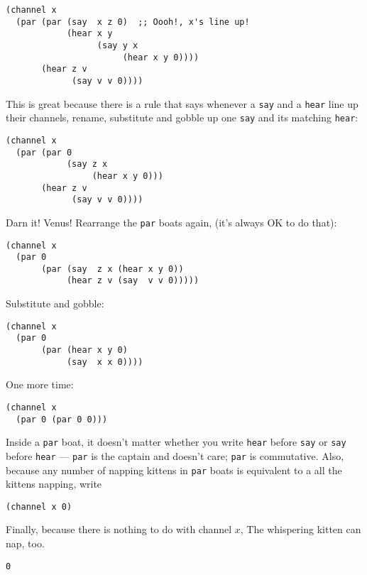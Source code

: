 \documentclass[10pt,oneside,x11names]{article}
\theoremstyle{definition}
\theoremstyle{warning}
\begin{document}
\vskip 0.26cm
\begin{verbatim}
(channel x
  (par (par (say  x z 0)  ;; Oooh!, x's line up!
            (hear x y
                  (say y x
                       (hear x y 0))))
       (hear z v
             (say v v 0))))
\end{verbatim}

This is great because there is a rule that says whenever a
\texttt{say} and a \texttt{hear} line up their channels, rename, substitute
and gobble up one \texttt{say} and its matching \texttt{hear}:

\vskip 0.26cm
\begin{verbatim}
(channel x
  (par (par 0
            (say z x
                 (hear x y 0)))
       (hear z v
             (say v v 0))))
\end{verbatim}

Darn it! Venus! Rearrange the \texttt{par} boats again, (it's always OK to do
that):

\vskip 0.26cm
\begin{verbatim}
(channel x
  (par 0
       (par (say  z x (hear x y 0))
            (hear z v (say  v v 0)))))
\end{verbatim}

Substitute and gobble:

\vskip 0.26cm
\begin{verbatim}
(channel x
  (par 0
       (par (hear x y 0)
            (say  x x 0))))
\end{verbatim}

One more time:

\vskip 0.26cm
\begin{verbatim}
(channel x
  (par 0 (par 0 0)))
\end{verbatim}

Inside a \texttt{par} boat, it doesn't matter whether you write
\texttt{hear} before \texttt{say} or \texttt{say} before \texttt{hear} --- \texttt{par} is the
captain and doesn't care; \texttt{par} is commutative. Also, because
any number of napping kittens in \texttt{par} boats is equivalent to
a all the kittens napping, write

\vskip 0.26cm
\begin{verbatim}
(channel x 0)
\end{verbatim}

\newpage
Finally, because there is nothing to do with channel \(x\), The
whispering kitten can nap, too.

\vskip 0.26cm
\begin{verbatim}
0
\end{verbatim}
\end{document}
